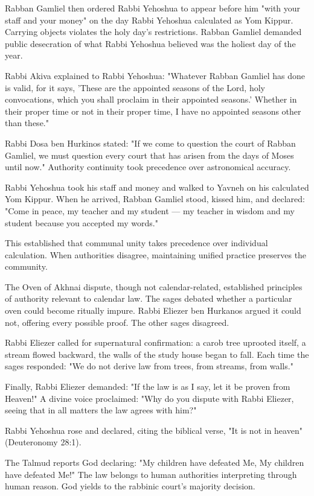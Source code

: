 Rabban Gamliel then ordered Rabbi Yehoshua to appear before him "with your staff and your money" on the day Rabbi Yehoshua calculated as Yom Kippur. Carrying objects violates the holy day's restrictions. Rabban Gamliel demanded public desecration of what Rabbi Yehoshua believed was the holiest day of the year.

Rabbi Akiva explained to Rabbi Yehoshua: "Whatever Rabban Gamliel has done is valid, for it says, 'These are the appointed seasons of the Lord, holy convocations, which you shall proclaim in their appointed seasons.' Whether in their proper time or not in their proper time, I have no appointed seasons other than these."

Rabbi Dosa ben Hurkinos stated: "If we come to question the court of Rabban Gamliel, we must question every court that has arisen from the days of Moses until now." Authority continuity took precedence over astronomical accuracy.

Rabbi Yehoshua took his staff and money and walked to Yavneh on his calculated Yom Kippur. When he arrived, Rabban Gamliel stood, kissed him, and declared: "Come in peace, my teacher and my student — my teacher in wisdom and my student because you accepted my words."

This established that communal unity takes precedence over individual calculation. When authorities disagree, maintaining unified practice preserves the community.

The Oven of Akhnai dispute, though not calendar-related, established principles of authority relevant to calendar law. The sages debated whether a particular oven could become ritually impure. Rabbi Eliezer ben Hurkanos argued it could not, offering every possible proof. The other sages disagreed.

Rabbi Eliezer called for supernatural confirmation: a carob tree uprooted itself, a stream flowed backward, the walls of the study house began to fall. Each time the sages responded: "We do not derive law from trees, from streams, from walls."

Finally, Rabbi Eliezer demanded: "If the law is as I say, let it be proven from Heaven!" A divine voice proclaimed: "Why do you dispute with Rabbi Eliezer, seeing that in all matters the law agrees with him?"

Rabbi Yehoshua rose and declared, citing the biblical verse, "It is not in heaven" (Deuteronomy 28:1).

The Talmud reports God declaring: "My children have defeated Me, My children have defeated Me!" The law belongs to human authorities interpreting through human reason. God yields to the rabbinic court's majority decision.

